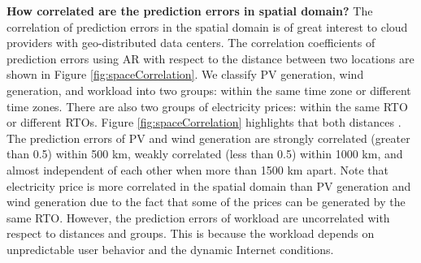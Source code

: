 \textbf{How correlated are the prediction errors in spatial domain?} The correlation of prediction errors in the spatial domain is of great interest to cloud providers with geo-distributed data centers. The correlation coefficients of prediction errors using AR with respect to the distance between two locations are shown in Figure \ref{fig:spaceCorrelation}. We classify PV generation, wind generation, and workload into two groups: within the same time zone or different time zones. There are also two groups of electricity prices: within the same RTO or different RTOs. Figure \ref{fig:spaceCorrelation} highlights that both distances . The prediction errors of PV and wind generation are strongly correlated (greater than 0.5) within 500 km, weakly correlated (less than 0.5) within 1000 km, and almost independent of each other when more than 1500 km apart. Note that electricity price is more correlated in the spatial domain than PV generation and wind generation due to the fact that some of the prices can be generated by the same RTO. However, the prediction errors of workload are uncorrelated with respect to distances and groups. This is because the workload depends on unpredictable user behavior and the dynamic Internet conditions.


